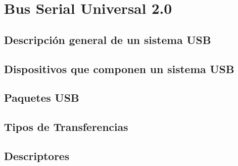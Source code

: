 \chapter{Bus Serial Universal 2.0}
	\label{cap:usb}
	
%			
		\section{Descripción general de un sistema USB}
			\label{usb:desc}
			
		\section{Dispositivos que componen un sistema USB}
			\label{usb:disp}
			
		\section{Paquetes USB}
			\label{usb:pkt}
			
		\section{Tipos de Transferencias}
			\label{usb:xfer}
			
		\section{Descriptores}
			\label{usb:dscr}
			
